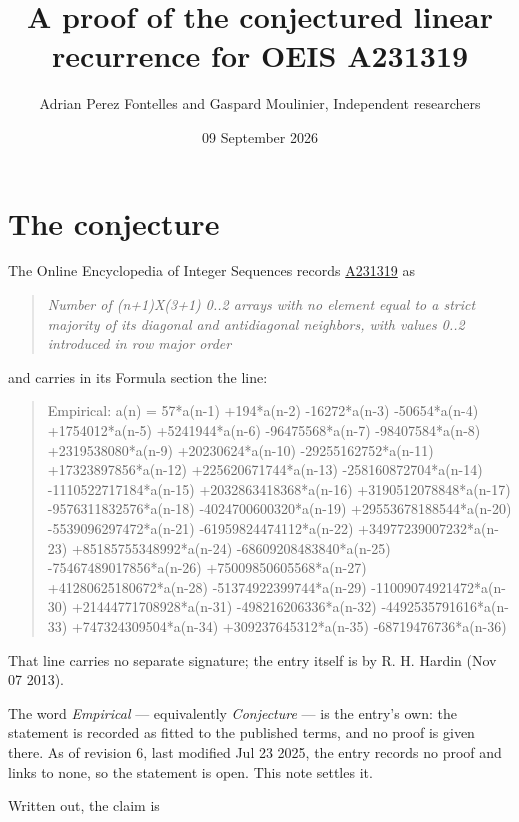 \documentclass[11pt]{article}
\title{A proof of the conjectured linear recurrence for OEIS A231319}
\author{Adrian Perez Fontelles and Gaspard Moulinier, Independent researchers}
\date{09 September 2026}
\theoremstyle{definition}
\begin{document}
\maketitle
\section{The conjecture}

The Online Encyclopedia of Integer Sequences records \href{https://oeis.org/A231319}{A231319} as

\begin{quote}\itshape Number of (n+1)X(3+1) 0..2 arrays with no element equal to a strict majority of its diagonal and antidiagonal neighbors, with values 0..2 introduced in row major order\end{quote}

and carries in its Formula section the line:

\begin{quote}\ttfamily Empirical: a(n) = 57*a(n-1) +194*a(n-2) -16272*a(n-3) -50654*a(n-4) +1754012*a(n-5) +5241944*a(n-6) -96475568*a(n-7) -98407584*a(n-8) +2319538080*a(n-9) +20230624*a(n-10) -29255162752*a(n-11) +17323897856*a(n-12) +225620671744*a(n-13) -258160872704*a(n-14) -1110522717184*a(n-15) +2032863418368*a(n-16) +3190512078848*a(n-17) -9576311832576*a(n-18) -4024700600320*a(n-19) +29553678188544*a(n-20) -5539096297472*a(n-21) -61959824474112*a(n-22) +34977239007232*a(n-23) +85185755348992*a(n-24) -68609208483840*a(n-25) -75467489017856*a(n-26) +75009850605568*a(n-27) +41280625180672*a(n-28) -51374922399744*a(n-29) -11009074921472*a(n-30) +21444771708928*a(n-31) -498216206336*a(n-32) -4492535791616*a(n-33) +747324309504*a(n-34) +309237645312*a(n-35) -68719476736*a(n-36)\end{quote}

That line carries no separate signature; the entry itself is by R. H. Hardin (Nov 07 2013).

The word {\itshape Empirical} --- equivalently {\itshape Conjecture} --- is the entry's own: the statement is recorded as fitted to the published terms, and no proof is given there. As of revision 6, last modified Jul 23 2025, the entry records no proof and links to none, so the statement is open. This note settles it.

Written out, the claim is
\end{document}
